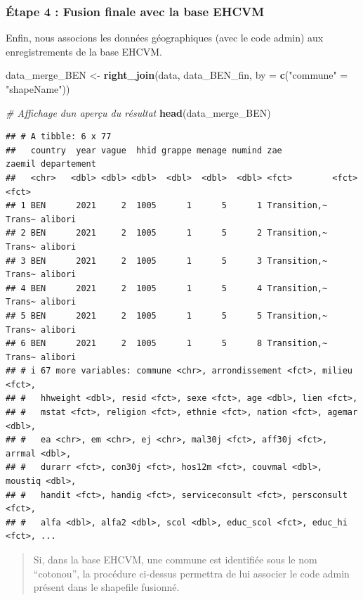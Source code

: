 \documentclass[
]{article}
\newenvironment{Shaded}{\begin{snugshade}}{\end{snugshade}}
\newcommand{\AttributeTok}[1]{\textcolor[rgb]{0.13,0.29,0.53}{#1}}
\newcommand{\CommentTok}[1]{\textcolor[rgb]{0.56,0.35,0.01}{\textit{#1}}}
\newcommand{\FunctionTok}[1]{\textcolor[rgb]{0.13,0.29,0.53}{\textbf{#1}}}
\newcommand{\NormalTok}[1]{#1}
\newcommand{\OtherTok}[1]{\textcolor[rgb]{0.56,0.35,0.01}{#1}}
\newcommand{\StringTok}[1]{\textcolor[rgb]{0.31,0.60,0.02}{#1}}
\begin{document}
\hypertarget{uxe9tape-4-fusion-finale-avec-la-base-ehcvm}{%
\subsubsection{Étape 4 : Fusion finale avec la base
EHCVM}\label{uxe9tape-4-fusion-finale-avec-la-base-ehcvm}}

Enfin, nous associons les données géographiques (avec le code admin) aux
enregistrements de la base EHCVM.

\begin{Shaded}
\begin{Highlighting}[]
\NormalTok{data\_merge\_BEN }\OtherTok{\textless{}{-}} \FunctionTok{right\_join}\NormalTok{(data, data\_BEN\_fin, }\AttributeTok{by =} \FunctionTok{c}\NormalTok{(}\StringTok{"commune"} \OtherTok{=} \StringTok{"shapeName"}\NormalTok{))}

\CommentTok{\# Affichage d\textquotesingle{}un aperçu du résultat}
\FunctionTok{head}\NormalTok{(data\_merge\_BEN)}
\end{Highlighting}
\end{Shaded}

\begin{verbatim}
## # A tibble: 6 x 77
##   country  year vague  hhid grappe menage numind zae          zaemil departement
##   <chr>   <dbl> <dbl> <dbl>  <dbl>  <dbl>  <dbl> <fct>        <fct>  <fct>      
## 1 BEN      2021     2  1005      1      5      1 Transition,~ Trans~ alibori    
## 2 BEN      2021     2  1005      1      5      2 Transition,~ Trans~ alibori    
## 3 BEN      2021     2  1005      1      5      3 Transition,~ Trans~ alibori    
## 4 BEN      2021     2  1005      1      5      4 Transition,~ Trans~ alibori    
## 5 BEN      2021     2  1005      1      5      5 Transition,~ Trans~ alibori    
## 6 BEN      2021     2  1005      1      5      8 Transition,~ Trans~ alibori    
## # i 67 more variables: commune <chr>, arrondissement <fct>, milieu <fct>,
## #   hhweight <dbl>, resid <fct>, sexe <fct>, age <dbl>, lien <fct>,
## #   mstat <fct>, religion <fct>, ethnie <fct>, nation <fct>, agemar <dbl>,
## #   ea <chr>, em <chr>, ej <chr>, mal30j <fct>, aff30j <fct>, arrmal <dbl>,
## #   durarr <fct>, con30j <fct>, hos12m <fct>, couvmal <dbl>, moustiq <dbl>,
## #   handit <fct>, handig <fct>, serviceconsult <fct>, persconsult <fct>,
## #   alfa <dbl>, alfa2 <dbl>, scol <dbl>, educ_scol <fct>, educ_hi <fct>, ...
\end{verbatim}

\begin{quote}
Si, dans la base EHCVM, une commune est identifiée sous le nom
``cotonou'', la procédure ci-dessus permettra de lui associer le code
admin présent dans le shapefile fusionné.
\end{quote}
\end{document}
